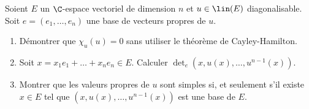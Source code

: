 \begin{enonce}
\begin{exercise}[ID={RMS125 E958, CCP MP},subtitle={2014 CCP MP},tags={}, difficulty={0}]
Soient $E$ un $\C$-espace vectoriel de dimension $n$ et $u\in\lin(E)$ diagonalisable.
Soit $e=\left( e_1,\dots,e_n \right)$ une base de vecteurs propres de $u$.
\begin{enumerate}
  \item Démontrer que $\chi_u(u)=0$ sans utiliser le théorème de Cayley-Hamilton.
  \item Soit $x=x_1e_1+\dots+x_ne_n\in E$.
    Calculer $\det_e\left( x, u(x),\dots, u^{n-1}(x) \right)$.
  \item Montrer que les valeurs propres de $u$ sont simples si, et seulement s'il existe $x\in E$
    tel que $\left( x, u(x),\dots,u^{n-1}(x) \right)$ est une base de $E$. 
\end{enumerate}
\end{exercise}
\begin{solution}
\end{solution}
\end{enonce}
